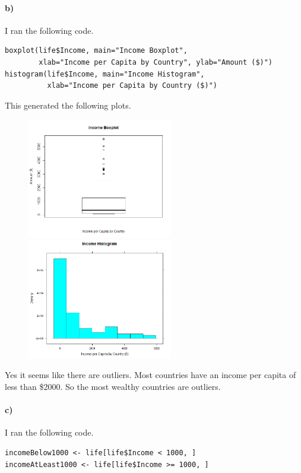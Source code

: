 \documentclass[12pt]{article}
\begin{document}
\paragraph{b)}

I ran the following code.
\begin{verbatim}
boxplot(life$Income, main="Income Boxplot",
        xlab="Income per Capita by Country", ylab="Amount ($)")
histogram(life$Income, main="Income Histogram",
          xlab="Income per Capita by Country ($)")
\end{verbatim}
This generated the following plots.
\begin{figure}[H]
    \begin{center}
        \includegraphics[width=2.5in]{exercise2b-box.png}
        \includegraphics[width=2.5in]{exercise2b-histogram.png}
    \end{center}
\end{figure}
Yes it seems like there are outliers. Most countries have an income per capita of less than \$2000.
So the most wealthy countries are outliers.

\paragraph{c)}

I ran the following code.
\begin{verbatim}
incomeBelow1000 <- life[life$Income < 1000, ]
incomeAtLeast1000 <- life[life$Income >= 1000, ]
\end{verbatim}
\end{document}
